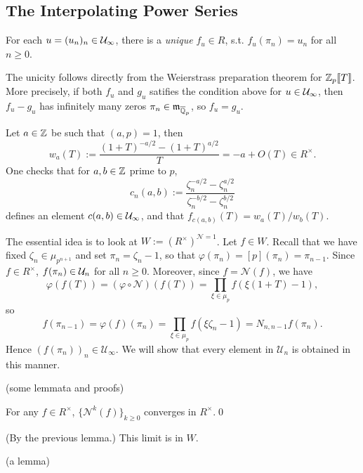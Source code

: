 \subsection{The Interpolating Power Series}

\begin{theorem}\label{existence of interpolating power series}
    For each $u = (u_n)_n\in \mathcal{U}_\infty$,
    there is a \textit{unique} $f_u\in R$,
    s.t. $f_u(\pi_n) = u_n$ for all $n\ge 0$.
\end{theorem}

The unicity follows directly from the Weierstrass preparation theorem for $\mathbb{Z}_p\llbracket T  \rrbracket$.
More precisely,
if both $f_u$ and $g_u$ satifies the condition above for $u\in\mathcal{U}_\infty$,
then $f_u - g_u$ has infinitely many zeros $\pi_n\in\mathfrak{m}_{\overline{\mathbb{Q}}_p}$,
so $f_u = g_u$.



\begin{example}
    Let $a\in\mathbb{Z} $ be such that $(a, p) = 1$, then\[w_a(T) := \frac{(1 + T)^{-a/2} - (1 + T)^{a/2}}{T} = -a + O(T)\in R^\times.\]
    One checks that for $a, b\in\mathbb{Z}$ prime to $p$,
    \[c_n(a, b) := \frac{\zeta_n^{-a/2} - \zeta_n^{a/2}}{\zeta_n^{-b/2} - \zeta_n^{b/2}}\]
    defines an element $c(a, b)\in\mathcal{U}_\infty$,
    and that $f_{c(a, b)}(T) = w_a(T)/w_b(T)$.
\end{example}


The essential idea is to look at $W := \left( R^\times \right)^{\mathcal{N} = 1}$.
Let $f\in W$.
Recall that we have fixed $\zeta_n\in\mu_{p^{n+1}}$ and set $\pi_n = \zeta_n - 1$,
so that $\varphi(\pi_n) = [p](\pi_n) = \pi_{n-1}$.
Since $f\in R^\times$,
$f(\pi_n)\in\mathcal{U}_n$ for all $n\ge 0$.
Moreover, since $f = \mathcal{N}(f)$,
we have \[\varphi (f(T)) = (\varphi\circ\mathcal{N})(f(T)) = \prod_{\xi\in\mu_p} f(\xi(1 + T) - 1),\]
so
\[f(\pi_{n-1}) = \varphi (f)(\pi_{n}) = \prod_{\xi\in\mu_p} f(\xi\zeta_n - 1) = N_{n, n-1}f(\pi_n).\]
Hence $(f(\pi_n))_n\in\mathcal{U}_\infty$.
We will show that every element in $\mathcal{U}_n$
is obtained in this manner.

(some lemmata and proofs)

\begin{corollary}\label{N is pointwise contracting on Zp[[T]]}
    For any $f\in R^\times$,
    $\{\mathcal{N}^k(f)\}_{k\ge 0}$ converges in $R^\times$.\qed
\end{corollary}
(By the previous lemma.)
This limit is in $W$.

(a lemma)

